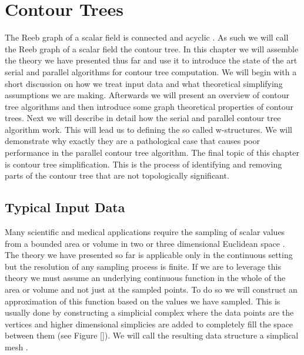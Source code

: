 \chapter{Contour Trees}
\label{chapter3}

The Reeb graph of a scalar field is connected and acyclic \cite{comp-topo}. As such we will call the Reeb graph of a scalar field the contour tree. In this chapter we will assemble the theory we have presented thus far and use it to introduce the state of the art serial and parallel algorithms for contour tree computation. We will begin with a short discussion on how we treat input data and what theoretical simplifying assumptions we are making. Afterwards we will present an overview of contour tree algorithms and then introduce some graph theoretical properties of contour trees. Next we will describe in detail how the serial and parallel contour tree algorithm work. This will lead us to defining the so called w-structures. We will demonstrate why exactly they are a pathological case that causes poor performance in the parallel contour tree algorithm. The final topic of this chapter is contour tree simplification. This is the process of identifying and removing parts of the contour tree that are not topologically significant.

\section{Typical Input Data}



Many scientific and medical applications require the sampling of scalar values from a bounded area or volume in two or three dimensional Euclidean space \cite{carr-masters}. The theory we have presented so far is applicable only in the continuous setting but the resolution of any sampling process is finite. If we are to leverage this theory we must assume an underlying continuous function in the whole of the area or volume and not just at the sampled points. To do so we will construct an approximation of this function based on the values we have sampled. This is usually done by constructing a simplicial complex where the data points are the vertices and higher dimensional simplicies are added to completely fill the space between them (see Figure []). We will call the resulting data structure a simplical mesh \cite{carr-masters}.

